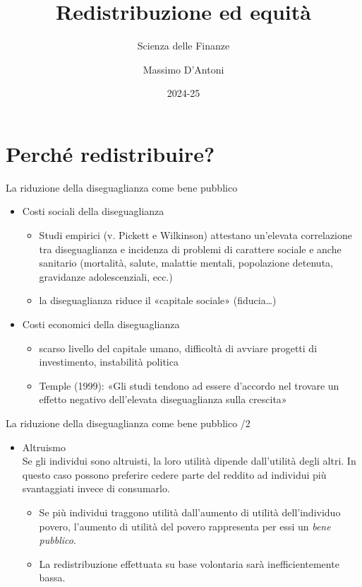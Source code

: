 \documentclass[aspectratio=64,12pt]{beamer}
\author{Massimo D'Antoni}
\institute{Università di Siena}
\date{2024-25}
\title{Redistribuzione ed equità}
\subtitle{Scienza delle Finanze}
\begin{document}
\maketitle

\section{Perché redistribuire?}

\begin{frame}{La riduzione della diseguaglianza come bene pubblico}
\begin{itemize}
\item \alert{Costi sociali della diseguaglianza}\\[0pt]
\begin{itemize}
\item Studi empirici (v. Pickett e Wilkinson) attestano un'elevata correlazione
tra diseguaglianza e incidenza di problemi di carattere sociale e anche
sanitario (mortalità, salute, malattie mentali, popolazione detenuta,
gravidanze adolescenziali, ecc.)
\item la diseguaglianza riduce il «capitale sociale» (fiducia\ldots{})
\end{itemize}

\item \alert{Costi economici della diseguaglianza}\\[0pt]
\begin{itemize}
\item scarso livello del capitale umano, difficoltà di avviare progetti di
investimento, instabilità politica
\item Temple (1999): «Gli studi tendono ad essere d'accordo nel trovare un
effetto negativo dell'elevata diseguaglianza sulla crescita»
\end{itemize}
\end{itemize}
\end{frame}

\begin{frame}{La riduzione della diseguaglianza come bene pubblico /2}
\begin{itemize}
\item \alert{Altruismo}\\[0pt]
Se gli individui sono altruisti, la loro utilità dipende dall'utilità degli
altri. In questo caso possono preferire cedere parte del reddito ad
individui più svantaggiati invece di consumarlo.
\begin{itemize}
\item Se più individui traggono utilità dall'aumento di utilità dell'individuo
povero, l'aumento di utilità del povero rappresenta per essi un \emph{bene
pubblico}.
\item La redistribuzione effettuata su base
volontaria sarà inefficientemente bassa.
\end{itemize}
\end{itemize}
\end{frame}
\end{document}
